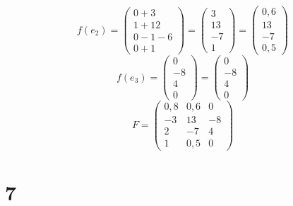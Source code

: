 $$ f(e_2) =
\begin{pmatrix}
	0 + 3 \\
    1 + 12 \\
    0 - 1 - 6 \\
    0 + 1
\end{pmatrix} =
\begin{pmatrix}
	3 \\
    13 \\
    -7 \\
    1
\end{pmatrix} =
\begin{pmatrix}
	0,6 \\
    13 \\
    -7 \\
    0,5
\end{pmatrix} $$
$$ f(e_3) =
\begin{pmatrix}
	0 \\
    -8 \\
    4 \\
    0
\end{pmatrix} =
\begin{pmatrix}
	0 \\
    -8 \\
    4 \\
    0
\end{pmatrix} $$
$$ F =
\begin{pmatrix}
    0,8 & 0,6 & 0 \\
    -3 & 13 & -8 \\
    2 & -7 & 4 \\
    1 & 0,5 & 0
\end{pmatrix} $$

\section{7}

